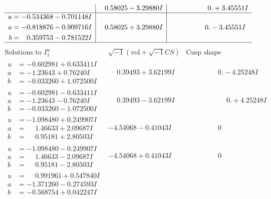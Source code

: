 \documentclass[1p]{elsarticle_modified}
\theoremstyle{definition}
\newcommand{\I}{\sqrt{-1}}
\begin{document}
$$\begin{array}{c|c|c}
 & \phantom{-}0.58025 - 3.29880 I & \phantom{-0.000000 -}0. + 3.45551 I \\ \hline\begin{aligned}
u &= -0.534368 - 0.701148 I \\
a &= -0.818876 - 0.909716 I \\
b &= \phantom{-}0.359753 - 0.781522 I\end{aligned}
 & \phantom{-}0.58025 + 3.29880 I & \phantom{-0.000000 } 0. - 3.45551 I\\
 \hline 
 \end{array}$$\newpage$$\begin{array}{c|c|c}  
\text{Solutions to }I^u_{1}& \I (\text{vol} + \sqrt{-1}CS) & \text{Cusp shape}\\
 \hline 
\begin{aligned}
u &= -0.602981 + 0.633411 I \\
a &= -1.23643 + 0.76240 I \\
b &= -0.033260 + 1.072500 I\end{aligned}
 & \phantom{-}0.39493 + 3.62199 I & \phantom{-0.000000 } 0. - 4.25248 I \\ \hline\begin{aligned}
u &= -0.602981 - 0.633411 I \\
a &= -1.23643 - 0.76240 I \\
b &= -0.033260 - 1.072500 I\end{aligned}
 & \phantom{-}0.39493 - 3.62199 I & \phantom{-0.000000 -}0. + 4.25248 I \\ \hline\begin{aligned}
u &= -1.098480 + 0.249907 I \\
a &= \phantom{-}1.46633 + 2.09687 I \\
b &= \phantom{-}0.95181 + 2.80503 I\end{aligned}
 & -4.54068 - 0.41043 I & \phantom{-0.000000 } 0 \\ \hline\begin{aligned}
u &= -1.098480 - 0.249907 I \\
a &= \phantom{-}1.46633 - 2.09687 I \\
b &= \phantom{-}0.95181 - 2.80503 I\end{aligned}
 & -4.54068 + 0.41043 I & \phantom{-0.000000 } 0 \\ \hline\begin{aligned}
u &= \phantom{-}0.991961 + 0.547840 I \\
a &= -1.371260 - 0.274593 I \\
b &= -0.568754 + 0.042247 I\end{aligned}

\end{array}$$
\end{document}
